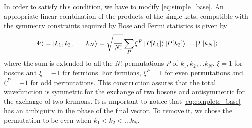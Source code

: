 In order to satisfy this condition, we have to modify \cref{eq:simple_base}. An appropriate linear combination of the products of the single kets, compatible with the symmetry constraints required by Bose and Fermi statistics is given by
\begin{equation} \label{eq:complete_base}
    \ket{\Psi} = \ket{k_1, k_2, \dots, k_N} = \sqrt{\frac{1}{N!}} \sum_P \xi^P \ket{P[k_1]}\ket{P[k_2]}\dots\ket{P[k_N]}
\end{equation}
where the sum is extended to all the $N!$ permutations $P$ of ${k_1, k_2, \dots k_N}$. $\xi = 1$ for bosons and $\xi = -1$ for fermions. For fermions, $\xi^P = 1$ for even permutations and $\xi^P = -1$ for odd permutations. This construction assures that the total wavefunction is symmetric for the exchange of two bosons and antisymmetric for the exchange of two fermions. It is important to notice that \cref{eq:complete_base} has an ambiguity in the phase of the final vector. To remove it, we chose the permutation to be even when $k_1 < k_2 < \dots k_N$.

